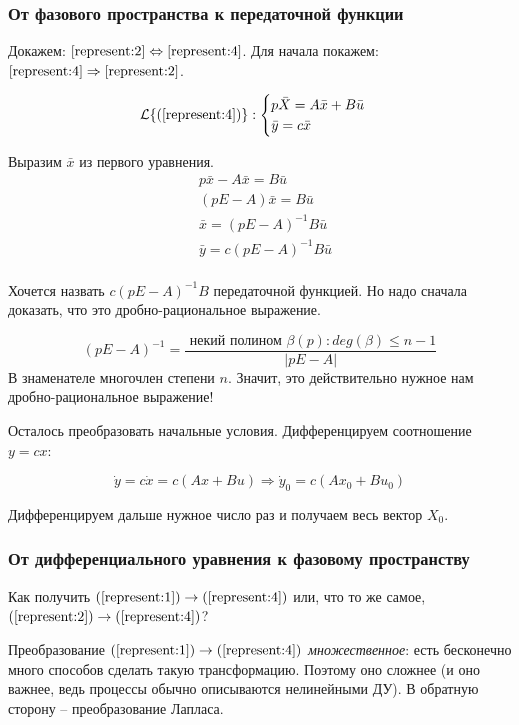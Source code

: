 \documentclass[main.tex]{subfiles}
\begin{document}
\subsubsection{ От фазового пространства к передаточной функции }

Докажем: $ \ref{represent:2} \Leftrightarrow \ref{represent:4} $.
Для начала покажем: $ \ref{represent:4} \Rightarrow \ref{represent:2} $.

\[ \mathcal{L}\{ (\ref{represent:4}) \}: \begin{cases}
    p \bar X = A \bar x + B \bar u \\
    \bar y = c \bar x
\end{cases} \]

Выразим $ \bar x $ из первого уравнения.
\begin{align*}
    & p \bar x - A \bar x = B \bar u \\
    & (pE - A) \bar x = B \bar u \\
    & \bar x = (pE - A)^{-1} B \bar u \\
    & \bar y = c (pE-A)^{-1} B \bar u \\
\end{align*}

Хочется назвать $ c (pE-A)^{-1} B $ передаточной функцией.
Но надо сначала доказать, что это дробно-рациональное выражение.

\[ (pE - A)^{-1} = \frac{ \text{ некий полином } \beta(p) : deg(\beta) \le n-1 }{|pE-A|} \]
В знаменателе многочлен степени $ n $.
Значит, это действительно нужное нам дробно-рациональное выражение!

Осталось преобразовать начальные условия.
Дифференцируем соотношение $ y = c x $:

\[ \dot y = c \dot x = c(Ax + Bu) \Rightarrow \dot y_0  = c(Ax_0 + Bu_0) \]

Дифференцируем дальше нужное число раз и получаем весь вектор $ X_0 $.

\subsubsection{ От дифференциального уравнения к фазовому пространству }

Как получить $ (\ref{represent:1}) \to (\ref{represent:4})$ или, что то же самое, $ (\ref{represent:2}) \to (\ref{represent:4}) $?

Преобразование $ (\ref{represent:1}) \to (\ref{represent:4}) $ \emph{множественное}: есть бесконечно много способов сделать такую трансформацию.
Поэтому оно сложнее (и оно важнее, ведь процессы обычно описываются нелинейными ДУ).
В обратную сторону -- преобразование Лапласа.
\end{document}
